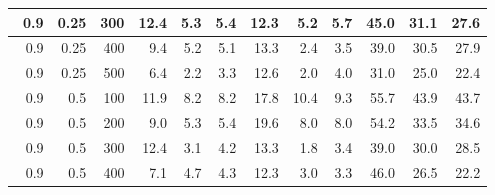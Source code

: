 \begin{longtable}{|r|r|r|r|r|r|r|r|r|r|r|r|}
        \hline \
        0.9                            & 0.25                    & 300                       & 12.4                       & 5.3                       & 5.4                       & 12.3                      & 5.2                       & 5.7                       & 45.0                      & 31.1                      & 27.6                      \\
        \hline \
        0.9                            & 0.25                     & 400                       & 9.4                      & 5.2                       & 5.1                       & 13.3                      & 2.4                      & 3.5                       & 39.0                      & 30.5                      & 27.9                      \\
        \hline \
        0.9                            & 0.25                     & 500                       & 6.4                       & 2.2                       & 3.3                       & 12.6                      & 2.0                       & 4.0                       & 31.0                      & 25.0                      & 22.4                      \\
        \hline \
        0.9                            & 0.5                     & 100                       & 11.9                      & 8.2                       & 8.2                       & 17.8                      & 10.4                       & 9.3                       & 55.7                      & 43.9                      & 43.7                      \\
        \hline \
        0.9                            & 0.5                     & 200                       & 9.0                       & 5.3                       & 5.4                       & 19.6                      & 8.0                       & 8.0                       & 54.2                      & 33.5                      & 34.6                      \\
        \hline \
        0.9                            & 0.5                     & 300                       & 12.4                       & 3.1                       & 4.2                       & 13.3                       & 1.8                       & 3.4                       & 39.0                      & 30.0                      & 28.5                      \\
        \hline \
        0.9                            & 0.5                    & 400                       & 7.1                      & 4.7                       & 4.3                       & 12.3                      & 3.0                      & 3.3                      & 46.0                      & 26.5                      & 22.2                      \\

\end{longtable}
